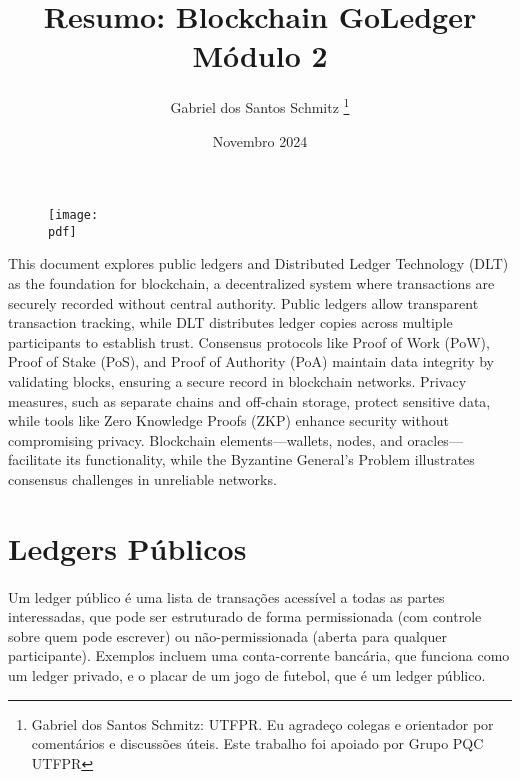 \documentclass[letterpaper,11pt,leqno]{article}
\newcommand{\pdf}{figures/figures}
\begin{document}
\begin{figure}[t]
	{\texttt{[image: \\pdf]}}
	\vspace{-50pt}
	\label{f:logo}\end{figure}

\title{Resumo: Blockchain GoLedger Módulo 2}

\author{Gabriel dos Santos Schmitz
	\thanks{Gabriel dos Santos Schmitz: UTFPR. Eu agradeço colegas e orientador
		por comentários e discussões úteis. Este trabalho foi apoiado por Grupo PQC
		UTFPR}}

\date{Novembro 2024}


\begin{titlepage}

	\maketitle

	This document explores public ledgers and Distributed Ledger Technology (DLT) as
	the foundation for blockchain, a decentralized system where transactions are
	securely recorded without central authority. Public ledgers allow transparent
	transaction tracking, while DLT distributes ledger copies across multiple
	participants to establish trust. Consensus protocols like Proof of Work (PoW),
	Proof of Stake (PoS), and Proof of Authority (PoA) maintain data integrity by
	validating blocks, ensuring a secure record in blockchain networks. Privacy
	measures, such as separate chains and off-chain storage, protect sensitive
	data, while tools like Zero Knowledge Proofs (ZKP) enhance security without
	compromising privacy. Blockchain elements—wallets, nodes, and
	oracles—facilitate its functionality, while the Byzantine General’s Problem
	illustrates consensus challenges in unreliable networks.

\end{titlepage}

\section{Ledgers Públicos}

\paragraph{}
Um ledger público é uma lista de transações acessível a todas as partes
interessadas, que pode ser estruturado de forma permissionada (com controle
sobre quem pode escrever) ou não-permissionada (aberta para qualquer
participante). Exemplos incluem uma conta-corrente bancária, que funciona como
um ledger privado, e o placar de um jogo de futebol, que é um ledger público.
\end{document}
